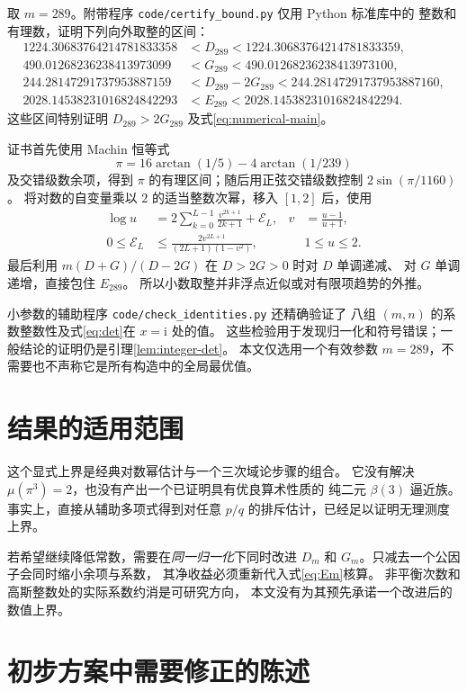 \documentclass[UTF8,fontset=fandol,a4paper,11pt]{ctexart}
\theoremstyle{remark}
\newcommand{\ii}{\mathrm i}
\numberwithin{equation}{section}
\begin{document}
取 $m=289$。附带程序 \texttt{code/certify\_bound.py} 仅用 Python 标准库中的
整数和有理数，证明下列向外取整的区间：
\begin{align*}
1224.30683764214781833358
 &<D_{289}<1224.30683764214781833359,\\
490.01268236238413973099
 &<G_{289}<490.01268236238413973100,\\
244.28147291737953887159
 &<D_{289}-2G_{289}<244.28147291737953887160,\\
2028.14538231016824842293
 &<E_{289}<2028.14538231016824842294.
\end{align*}
这些区间特别证明 $D_{289}>2G_{289}$ 及式\eqref{eq:numerical-main}。

证书首先使用 Machin 恒等式
\[
\pi=16\arctan(1/5)-4\arctan(1/239)
\]
及交错级数余项，得到 $\pi$ 的有理区间；随后用正弦交错级数控制
$2\sin(\pi/1160)$。
将对数的自变量乘以 $2$ 的适当整数次幂，移入 $[1,2]$ 后，使用
\begin{align*}
\log u&=2\sum_{k=0}^{L-1}\frac{v^{2k+1}}{2k+1}+\mathcal E_L,
 &v&=\frac{u-1}{u+1},\\
0\le\mathcal E_L&\le
\frac{2v^{2L+1}}{(2L+1)(1-v^2)}, &&1\le u\le2.
\end{align*}
最后利用 $m(D+G)/(D-2G)$ 在 $D>2G>0$ 时对 $D$ 单调递减、
对 $G$ 单调递增，直接包住 $E_{289}$。
所以小数取整并非浮点近似或对有限项趋势的外推。

小参数的辅助程序 \texttt{code/check\_identities.py} 还精确验证了
八组 $(m,n)$ 的系数整数性及式\eqref{eq:det}在 $x=\ii$ 处的值。
这些检验用于发现归一化和符号错误；一般结论的证明仍是引理\ref{lem:integer-det}。
本文仅选用一个有效参数 $m=289$，不需要也不声称它是所有构造中的全局最优值。

\section{结果的适用范围}

这个显式上界是经典对数幂估计与一个三次域论步骤的组合。
它没有解决 $\mu(\pi^3)=2$，也没有产出一个已证明具有优良算术性质的
纯二元 $\beta(3)$ 逼近族。事实上，直接从辅助多项式得到对任意
$p/q$ 的排斥估计，已经足以证明无理测度上界。

若希望继续降低常数，需要在\emph{同一归一化}下同时改进
$D_m$ 和 $G_m$。只减去一个公因子会同时缩小余项与系数，
其净收益必须重新代入式\eqref{eq:Em}核算。
非平衡次数和高斯整数处的实际系数约消是可研究方向，
本文没有为其预先承诺一个改进后的数值上界。

\appendix
\section{初步方案中需要修正的陈述}
\end{document}
